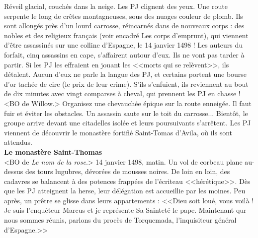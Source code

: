 \documentclass[11pt,twoside,a4paper]{book}
\begin{document}
R{\'e}veil glacial, couch{\'e}s dans la neige. Les PJ clignent des yeux. Une route serpente le long de cr{\^e}tes montagneuses, sous des nuages couleur de plomb. Ils sont allong{\'e}s pr{\`e}s d'un lourd carrosse, r{\'e}incarn{\'e}s dans de nouveaux corps : des nobles et des religieux fran\c{c}ais (voir encadr{\'e} Les corps d'emprunt), qui viennent d'{\^e}tre assassin{\'e}s sur une colline d'Espagne, le 14 janvier 1498 ! Les auteurs du forfait, cinq assassins en cape, s'affairent autour d'eux. Ils ne vont pas tarder {\`a} partir. Si les PJ les effraient en jouant les <<morts qui se rel{\`e}vent>>, ils d{\'e}talent. Aucun d'eux ne parle la langue des PJ, et certains portent une bourse d'or tach{\'e}e de cire (le prix de leur crime). S'ils s'enfuient, ils reviennent au bout de dix minutes avec vingt comparses {\`a} cheval, qui prennent les PJ en chasse ! <BO de Willow.> Organisez une chevauch{\'e}e {\'e}pique sur la route enneig{\'e}e. Il faut fuir et {\'e}viter les obstacles. Un assassin saute sur le toit du carrosse... Bient{\^o}t, le groupe arrive devant une citadelles isol{\'e}e et leurs poursuivants s'arr{\^e}tent. Les PJ viennent de d{\'e}couvrir le monast{\`e}re fortifi{\'e} Saint-Tomas d'Avila, o{\`u} ils sont attendus.~\\

\textbf{\large Le monast{\`e}re Saint-Thomas}~\\

<BO de \emph{Le nom de la rose}.> 14 janvier 1498, matin. Un vol de corbeau plane au-dessus des tours lugubres, d{\'e}vor{\'e}es de mousses noires. De loin en loin, des cadavres se balancent {\`a} des potences frapp{\'e}es de l'{\'e}criteau <<h{\'e}r{\'e}tique>>. D{\`e}s que les PJ atteignent la herse, leur d{\'e}l{\'e}gation est accueillie par les moines. Peu apr{\`e}s, un pr{\^e}tre se glisse dans leurs appartements : <<Dieu soit lou{\'e}, vous voil{\`a} ! Je suis l'enqu{\^e}teur Marcus et je repr{\'e}sente Sa Saintet{\'e} le pape. Maintenant qur nous sommes r{\'e}unis, parlons du proc{\`e}s de Torquemada, l'inquisiteur g{\'e}n{\'e}ral d'Espagne.>>~\\

\clearpage
\end{document}
